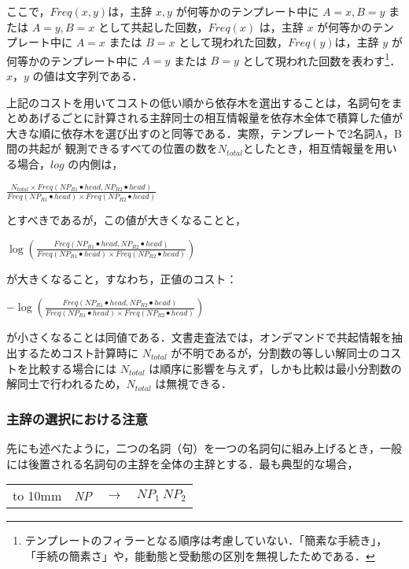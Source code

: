 ここで，$Freq(x, y)$は，主辞 $x, y$ が何等かのテンプレート中に $A=x, B=y$ または $A=y, B=x$ として共起した回数，$Freq(x)$ は，主辞 $x$ が何等かのテンプレート中に $A=x$ または $B=x$ として現われた回数，$Freq(y)$は，主辞 $y$ が何等かのテンプレート中に $A=y$ または $B=y$ として現われた回数を表わす\footnote{テンプレートのフィラーとなる順序は考慮していない．「簡素な手続き」，「手続の簡素さ」や，能動態と受動態の区別を無視したためである．}．$x，y$ の値は文字列である．

上記のコストを用いてコストの低い順から依存木を選出することは，名詞句をまとめあげるごとに計算される主辞同士の相互情報量\cite{Church1990}を依存木全体で積算した値が大きな順に依存木を選び出すのと同等である．実際，テンプレートで2名詞A，B間の共起が\break
観測できるすべての位置の数を$N_{total}$としたとき，相互情報量を用いる場合，$log$ の内側は，
\begin{center}
$\displaystyle \frac{N_{total}{\times}Freq(NP_{R1}{\bullet}head, NP_{R2}{\bullet}head)}{Freq(NP_{R1}{\bullet}head){\times}Freq(NP_{R2}{\bullet}head)}$
\end{center}
\noindent
とすべきであるが，この値が大きくなることと，
\begin{center}
$\displaystyle \log(\frac{Freq(NP_{R1}{\bullet}head, NP_{R2}{\bullet}head)}{Freq(NP_{R1}{\bullet}head){\times}Freq(NP_{R2}{\bullet}head)})$
\end{center}
\noindent
が大きくなること，すなわち，正値のコスト：
\begin{center}
$\displaystyle -\log(\frac{Freq(NP_{R1}{\bullet}head, NP_{R2}{\bullet}head)}{Freq(NP_{R1}{\bullet}head){\times}Freq(NP_{R2}{\bullet}head)})$
\end{center}
\noindent
が小さくなることは同値である．文書走査法では，オンデマンドで共起情報を抽出するためコスト計算時に $N_{total}$ が不明であるが，分割数の等しい解同士のコストを比較する場合には $N_{total}$ は順序に影響を与えず，しかも比較は最小分割数の解同士で行われるため，$N_{total}$ は無視できる．

\subsubsection{主辞の選択における注意}\label{主辞の選択における注意}
先にも述べたように，二つの名詞（句）を一つの名詞句に組み上げるとき，一般には後置される名詞句の主辞を全体の主辞とする．最も典型的な場合，

\begin{tabular}{clll}
\hbox to 10mm {\hfil} & \it NP & $\rightarrow$ & \it $NP_1\ NP_2$
\end{tabular}

